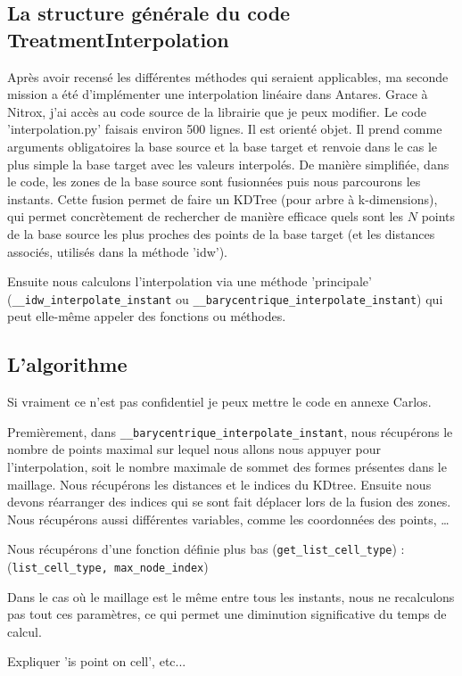 \subsection{La structure générale du code TreatmentInterpolation}
Après avoir recensé les différentes méthodes qui seraient applicables, ma seconde mission a été d'implémenter une interpolation linéaire dans Antares. Grace à Nitrox, j'ai accès au code source de la librairie que je peux modifier. Le code 'interpolation.py' faisais environ 500 lignes. Il est orienté objet. Il prend comme arguments obligatoires la base source et la base target et renvoie dans le cas le plus simple la base target avec les valeurs interpolés.
De manière simplifiée, dans le code, les zones de la base source sont fusionnées puis nous parcourons les instants. 
Cette fusion permet de faire un KDTree (pour arbre à k-dimensions), qui permet concrètement de rechercher de manière efficace quels sont les \( N \) points de la base source les plus proches des points de la base target (et les distances associés, utilisés dans la méthode 'idw').

Ensuite nous calculons l'interpolation via une méthode 'principale' (\lstinline{__idw_interpolate_instant} ou
\lstinline{__barycentrique_interpolate_instant}) qui peut elle-même appeler des fonctions ou méthodes.

\subsection{L'algorithme}
Si vraiment ce n'est pas confidentiel je peux mettre le code en annexe Carlos.

Premièrement, dans \lstinline{__barycentrique_interpolate_instant}, nous récupérons le nombre de points maximal sur lequel nous allons nous appuyer pour l'interpolation, soit le nombre maximale de sommet des formes présentes dans le maillage.
Nous récupérons les distances et le indices du KDtree.
Ensuite nous devons réarranger des indices qui se sont fait déplacer lors de la fusion des zones.
Nous récupérons aussi différentes variables, comme les coordonnées des points, \dots

Nous récupérons d'une fonction définie plus bas (\lstinline{get_list_cell_type}) :
(\lstinline{list_cell_type, max_node_index})


Dans le cas où le maillage est le même entre tous les instants, nous ne recalculons pas tout ces paramètres, ce qui permet une diminution significative du temps de calcul.


Expliquer 'is point on cell', etc...


